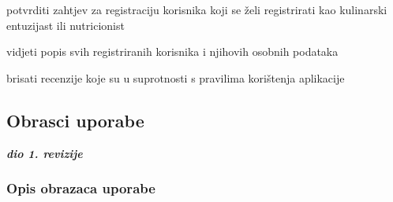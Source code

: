 \begin{packed_enum}
				\item {}
				\begin{packed_enum}
					\item potvrditi zahtjev za registraciju korisnika koji se želi registrirati kao kulinarski entuzijast ili nutricionist
					\item vidjeti popis svih registriranih korisnika i njihovih osobnih podataka
					\item brisati recenzije koje su u suprotnosti s pravilima korištenja aplikacije 
				\end{packed_enum}
					
				
			\end{packed_enum}
			
			\eject 
			
			
				
			\subsection{Obrasci uporabe}
				
				\textbf{\textit{dio 1. revizije}}
				
				\subsubsection{Opis obrazaca uporabe}
						
